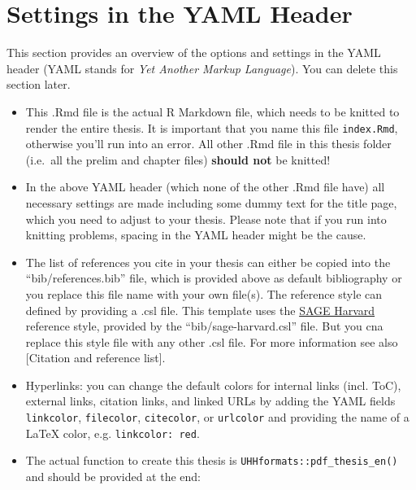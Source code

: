 \documentclass[a4paper,12pt]{article}
\providecommand{\tightlist}{%
  \setlength{\itemsep}{0pt}\setlength{\parskip}{0pt}}
\begin{document}
\newpage
\pagestyle{plain}
\setcounter{page}{1}    %

\hypertarget{settings-in-the-yaml-header}{%
\section*{Settings in the YAML Header}\label{settings-in-the-yaml-header}}

This section provides an overview of the options and settings in the YAML header (YAML stands for \emph{Yet Another Markup Language}). You can delete this section later.
\begin{itemize}
\tightlist
\item
  This .Rmd file is the actual R Markdown file, which needs to be knitted to render the entire thesis. It is important that you name this file \texttt{index.Rmd}, otherwise you'll run into an error. All other .Rmd file in this thesis folder (i.e.~all the prelim and chapter files) \textbf{should not} be knitted!
\item
  In the above YAML header (which none of the other .Rmd file have) all necessary settings are made including some dummy text for the title page, which you need to adjust to your thesis. Please note that if you run into knitting problems, spacing in the YAML header might be the cause.
\item
  The list of references you cite in your thesis can either be copied into the \enquote{bib/references.bib} file, which is provided above as default bibliography or you replace this file name with your own file(s). The reference style can defined by providing a .csl file. This template uses the \href{https://uk.sagepub.com/sites/default/files/sage_harvard_reference_style_0.pdf}{SAGE Harvard} reference style, provided by the \enquote{bib/sage-harvard.csl} file. But you cna replace this style file with any other .csl file. For more information see also {[}Citation and reference list{]}.
\item
  Hyperlinks: you can change the default colors for internal links (incl. ToC), external links, citation links, and linked URLs by adding the YAML fields \texttt{linkcolor}, \texttt{filecolor}, \texttt{citecolor}, or \texttt{urlcolor} and providing the name of a LaTeX color, e.g. \texttt{linkcolor:\ red}.
\item
  The actual function to create this thesis is \texttt{UHHformats::pdf\_thesis\_en()} and should be provided at the end:
\end{itemize}
\end{document}
